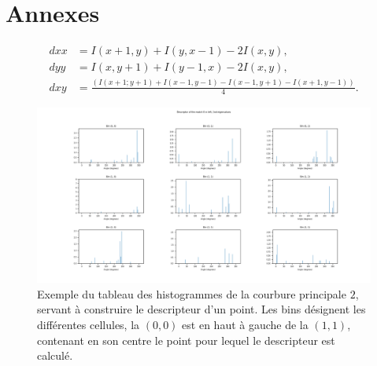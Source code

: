 \documentclass[
	a4paper, %
	10pt, %
	unnumberedsections, %
	twoside, %
]{LTJournalArticle}
\begin{document}
\clearpage

\section{Annexes}

\begin{equation} \label{eq:hess_coefs}
	\begin{split}
		dxx & = I(x+1, y) + I(y, x-1) - 2I(x, y),                                              \\
		dyy & = I(x, y+1) + I(y-1, x) - 2I(x, y),                                              \\
		dxy & = \frac{\left(I(x+1; y+1) + I(x-1, y-1) - I(x-1, y+1) - I(x+1, y-1) \right)}{4}.
	\end{split}
\end{equation}

\begin{figure}[H]
	\centering
	\includegraphics[width=\textwidth]{images/histo_result.png}
	\caption{Exemple du tableau des histogrammes de la courbure principale $2$,
		servant à construire le descripteur d'un point. Les bins désignent les différentes
		cellules, la $(0,0)$ est en haut à gauche de la $(1,1)$, contenant en son
		centre le point pour lequel le descripteur est calculé.}
	\label{figure:fig_hist}
\end{figure}

\clearpage
\end{document}
